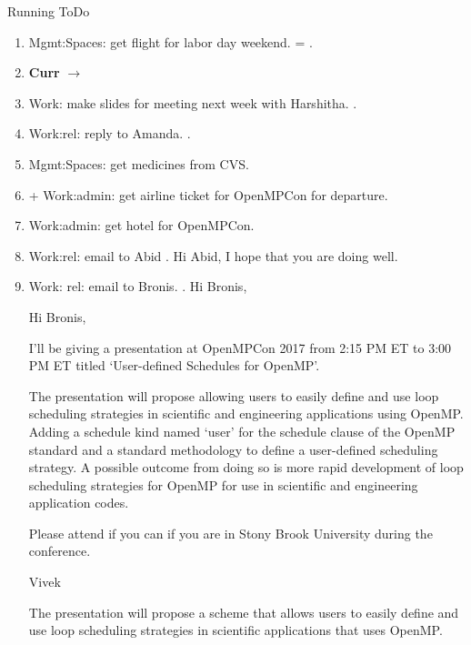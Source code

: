 \begin{columns}
\begin{column}{0.6\linewidth}
\begin{block}{Running ToDo}
\begin{enumerate}
      . 
      . 
      \item \tiny Mgmt:Spaces: get flight for labor day
        weekend.    = 
        
       .  
     \item \tiny \textbf{Curr} $\rightarrow$ 
     \item \tiny Work: make slides for meeting next week with
       Harshitha. . 
     \item \tiny Work:rel: reply to Amanda. .   
     \item \tiny Mgmt:Spaces: get medicines from CVS.
     \item \tiny {} + Work:admin: get airline ticket for
       OpenMPCon for departure. 
      \item \tiny Work:admin: get hotel for OpenMPCon.  

      \item \tiny Work:rel: email to Abid .            
        Hi Abid, I hope that you are doing well. 
        
      \item \tiny Work: rel: email to Bronis. . 
Hi Bronis,

Hi Bronis,

I’ll be giving a presentation at OpenMPCon 2017 from 2:15 PM ET to 3:00 PM ET titled ‘User-defined Schedules for OpenMP’.

The presentation will propose allowing users to easily define and use loop scheduling strategies in scientific and engineering applications using OpenMP. Adding a schedule kind named ‘user’ for the schedule clause of the OpenMP standard and a standard methodology to define a user-defined scheduling strategy. A possible outcome from doing so is more rapid development of loop scheduling strategies for OpenMP for use in scientific and engineering application codes.

Please attend if you can if you are in Stony Brook University during the conference.

Vivek


The presentation will propose a scheme that allows users to easily define and use loop scheduling strategies in scientific applications that uses OpenMP. 



\end{enumerate}
\end{block}
\end{column}
\end{columns}
